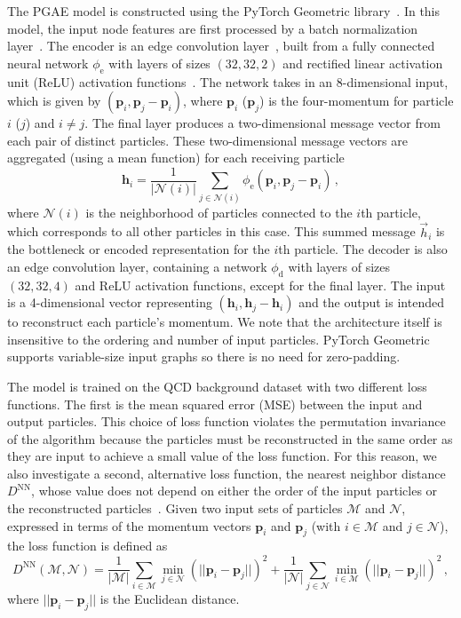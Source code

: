 \documentclass[letterpaper,11pt]{article}
\begin{document}
The PGAE model is constructed using the PyTorch Geometric library~\cite{PyTorchGeometric}.
In this model, the input node features are first processed by a batch normalization layer~\cite{batchnorm}.
The encoder is an edge convolution layer~\cite{DGCNN}, built from a fully connected neural network $\phi_\mathrm{e}$ with layers of sizes $(32, 32, 2)$ and rectified linear activation unit (ReLU) activation functions~\cite{relu}.
The network takes in an 8-dimensional input, which is given by $(\boldsymbol{p}_i, \boldsymbol{p}_j-\boldsymbol{p}_i)$, where $\boldsymbol{p}_i$ ($\boldsymbol{p}_j$) is the four-momentum for particle $i$ ($j$) and $i\neq j$.
The final layer produces a two-dimensional message vector from each pair of distinct particles.
These two-dimensional message vectors are aggregated (using a mean function) for each receiving particle
\begin{equation}
\boldsymbol{h}_i = \frac{1}{|\mathcal N(i)|}\sum_{j\in \mathcal N(i)} \phi_\mathrm{e}(\boldsymbol{p}_i, \boldsymbol{p}_j-\boldsymbol{p}_i)\,,
\end{equation}
where $\mathcal N(i)$ is the neighborhood of particles connected to the $i$th particle, which corresponds to all other particles in this case.
This summed message $\vec h_i$ is the bottleneck or encoded representation for the $i$th particle.
The decoder is also an edge convolution layer, containing a network $\phi_\mathrm{d}$ with layers of sizes $(32, 32, 4)$ and ReLU activation functions, except for the final layer.
The input is a 4-dimensional vector representing $(\boldsymbol{h}_i, \boldsymbol{h}_j-\boldsymbol{h}_i)$ and the output is intended to reconstruct each particle's momentum.
We note that the architecture itself is insensitive to the ordering and number of input particles. 
PyTorch Geometric supports variable-size input graphs so there is no need for zero-padding.

The model is trained on the QCD background dataset with two different loss functions. 
The first is the mean squared error (MSE) between the input and output particles. 
This choice of loss function violates the permutation invariance of the algorithm because the particles must be reconstructed in the same order as they are input to achieve a small value of the loss function.
For this reason, we also investigate a second, alternative loss function, the nearest neighbor distance $D^\mathrm{NN}$, whose value does not depend on either the order of the input particles or the reconstructed particles~\cite{sparsegen_vae}.
Given two input sets of particles $\mathcal{M}$ and $\mathcal{N}$, expressed in terms of the momentum vectors $\boldsymbol{p}_i$ and $\boldsymbol{p}_j$ (with $i \in \mathcal{M}$ and $j \in \mathcal{N}$), the loss function is defined as
\begin{equation}
D^\mathrm{NN}(\mathcal{M}, \mathcal{N}) =  \frac{1}{|\mathcal{M}|}\sum_{i \in \mathcal{M}} \min_{j \in \mathcal{N}} \left(||\boldsymbol{p}_i - \boldsymbol{p}_j||\right)^2 + \frac{1}{|\mathcal{N}|}\sum_{j \in \mathcal{N}} \min_{i \in \mathcal{M}} \left(||\boldsymbol{p}_i - \boldsymbol{p}_j||\right)^2\,,
\label{eq:L_NND}
\end{equation}
where $||\boldsymbol{p}_i-\boldsymbol{p}_j||$ is the Euclidean distance.
\end{document}
